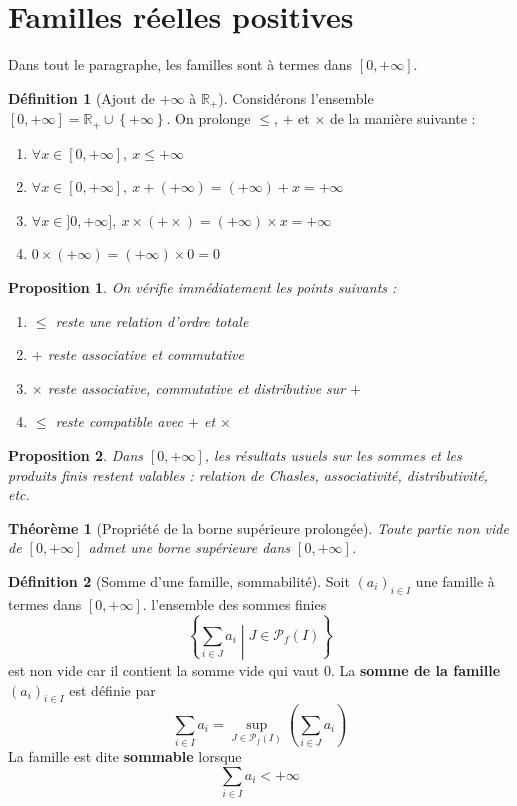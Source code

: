 \documentclass[french]{book}
\newcommand{\R}{\mathbb{R}}
\newcommand{\tq}{\middle|}
\theoremstyle{plain}
\newtheorem{thm}{Théorème}[chapter]
\newtheorem{prop}{Proposition}[chapter]
\theoremstyle{definition}
\newtheorem{dfn}{Définition}[chapter]
\theoremstyle{remark}
\begin{document}
\section{Familles réelles positives}
Dans tout le paragraphe, les familles sont à termes dans $[0,+\infty]$.
\begin{dfn}[Ajout de $+\infty$ à $\R_+$]
	Considérons l'ensemble $[0,+\infty]=\R_+\cup\left\{+\infty\right\}$. On prolonge $\leqslant$, $+$ et $\times$ de la manière suivante :
	\begin{enumerate}
		\item $\forall x\in[0,+\infty],\ x\leqslant+\infty$
		\item $\forall x\in[0,+\infty],\ x+(+\infty)=(+\infty)+x=+\infty$
		\item $\forall x\in]0,+\infty],\ x\times(+\times)=(+\infty)\times x=+\infty$
		\item $0\times (+\infty)=(+\infty)\times 0=0$
	\end{enumerate}
\end{dfn}
\begin{prop}
	On vérifie immédiatement les points suivants :
	\begin{enumerate}
		\item $\leqslant$ reste une relation d'ordre totale
		\item $+$ reste associative et commutative
		\item $\times$ reste associative, commutative et distributive sur $+$
		\item $\leqslant$ reste compatible avec $+$ et $\times$
	\end{enumerate}
\end{prop}
\begin{prop}
	Dans $[0,+\infty]$, les résultats usuels sur les sommes et les produits finis restent valables : relation de Chasles, associativité, distributivité, etc.
\end{prop}
\begin{thm}[Propriété de la borne supérieure prolongée]
	Toute partie non vide de $[0,+\infty]$ admet une  borne supérieure dans $[0,+\infty]$.
\end{thm}
\begin{dfn}[Somme d'une famille, sommabilité]
	Soit $(a_i)_{i\in I}$ une famille à termes dans $[0,+\infty]$. l'ensemble des sommes finies $$\left\{\sum_{i\in J}a_i \tq J\in\mathcal{P}_f(I)\right\}$$ est non vide car il contient la somme vide qui vaut $0$. La \textbf{somme de la famille} $(a_i)_{i\in I}$ est définie par $$\sum_{i\in I}a_i=\underset{J\in\mathcal{P}_f(I)}{\sup}\left(\sum_{i\in J}a_i\right)$$ La famille est dite \textbf{sommable} lorsque $$\sum_{i\in I}a_i<+\infty$$
\end{dfn}
\end{document}
